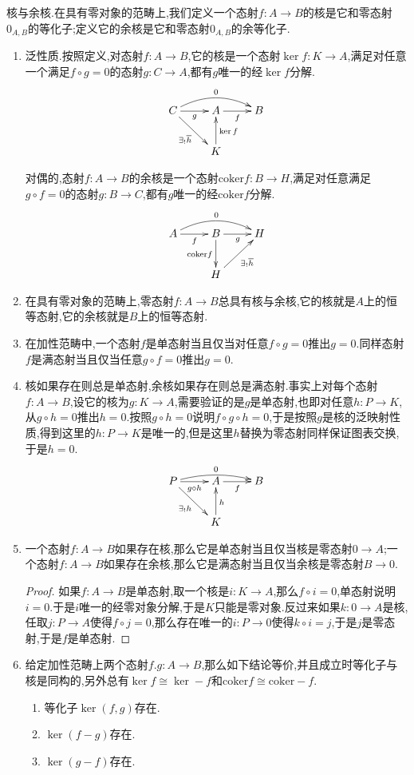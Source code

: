 核与余核.在具有零对象的范畴上,我们定义一个态射$f:A\to B$的核是它和零态射$0_{A,B}$的等化子;定义它的余核是它和零态射$0_{A,B}$的余等化子.
\begin{enumerate}
	\item 泛性质.按照定义,对态射$f:A\to B$,它的核是一个态射$\ker f:K\to A$,满足对任意一个满足$f\circ g=0$的态射$g:C\to A$,都有$g$唯一的经$\ker f$分解.
	$$\xymatrix{C\ar[dr]_{\exists_!\overline{h}}\ar[r]_g\ar@/^1pc/[rr]^0&A\ar[r]_f&B\\&K\ar[u]_{\ker f}&}$$
	
	对偶的,态射$f:A\to B$的余核是一个态射$\mathrm{coker}f:B\to H$,满足对任意满足$g\circ f=0$的态射$g:B\to C$,都有$g$唯一的经$\mathrm{coker}f$分解.
	$$\xymatrix{A\ar[r]_f\ar@/^1pc/[rr]^0&B\ar[d]_{\mathrm{coker}f}\ar[r]_g&H\\&H\ar[ur]_{\exists_!\overline{h}}&}$$
	\item 在具有零对象的范畴上,零态射$f:A\to B$总具有核与余核,它的核就是$A$上的恒等态射,它的余核就是$B$上的恒等态射.
    \item 在加性范畴中,一个态射$f$是单态射当且仅当对任意$f\circ g=0$推出$g=0$.同样态射$f$是满态射当且仅当任意$g\circ f=0$推出$g=0$.
    \item 核如果存在则总是单态射,余核如果存在则总是满态射.事实上对每个态射$f:A\to B$,设它的核为$g:K\to A$,需要验证的是$g$是单态射,也即对任意$h:P\to K$,从$g\circ h=0$推出$h=0$.按照$g\circ h=0$说明$f\circ g\circ h=0$,于是按照$g$是核的泛映射性质,得到这里的$h:P\to K$是唯一的,但是这里$h$替换为零态射同样保证图表交换,于是$h=0$.
    $$\xymatrix{P\ar[dr]_{\exists_!h}\ar[r]_{g\circ h}\ar@/^/[rr]^0&A\ar[r]_f&B\\&K\ar[u]_{h}&}$$
    \item 一个态射$f:A\to B$如果存在核,那么它是单态射当且仅当核是零态射$0\to A$;一个态射$f:A\to B$如果存在余核,那么它是满态射当且仅当余核是零态射$B\to0$.
    \begin{proof}
    	
    	如果$f:A\to B$是单态射,取一个核是$i:K\to A$,那么$f\circ i=0$,单态射说明$i=0$.于是$i$唯一的经零对象分解,于是$K$只能是零对象.反过来如果$k:0\to A$是核,任取$j:P\to A$使得$f\circ j=0$,那么存在唯一的$i:P\to0$使得$k\circ i=j$,于是$j$是零态射,于是$f$是单态射.
    \end{proof}
    \item 给定加性范畴上两个态射$f.g:A\to B$,那么如下结论等价,并且成立时等化子与核是同构的,另外总有$\ker f\cong\ker -f$和$\mathrm{coker}f\cong\mathrm{coker}-f$.
    \begin{enumerate}
    	\item 等化子$\ker(f,g)$存在.
    	\item $\ker(f-g)$存在.
    	\item $\ker(g-f)$存在.
    \end{enumerate}
\end{enumerate}

